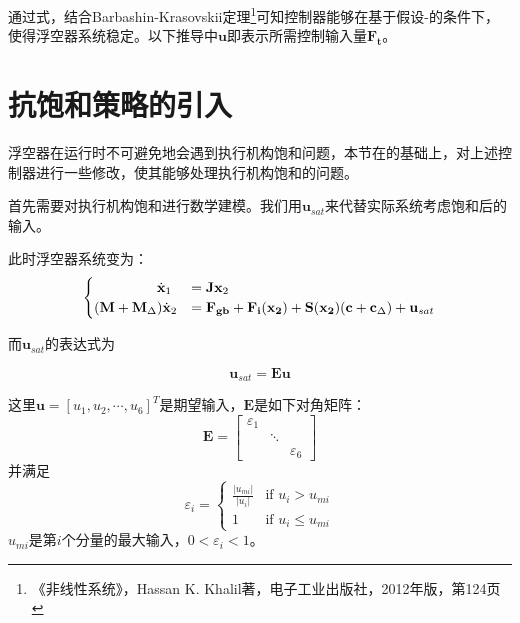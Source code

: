 通过式，结合Barbashin-Krasovskii定理\footnote{《非线性系统》\cite{Khalilnonlinearbookchinese}，Hassan K. Khalil著，电子工业出版社，2012年版，第124页}可知控制器能够在基于假设-的条件下，使得浮空器系统稳定。以下推导中$\mathbf{u}$即表示所需控制输入量$\mathbf{F_t}$。

\section{抗饱和策略的引入}\label{sec:3sat}
浮空器在运行时不可避免地会遇到执行机构饱和问题，本节在的基础上，对上述控制器进行一些修改，使其能够处理执行机构饱和的问题。

首先需要对执行机构饱和进行数学建模。我们用$\mathbf{u}_{sat}$来代替实际系统考虑饱和后的输入。

此时浮空器系统变为：
\begin{equation}\label{eq:modelwcsat}
    \begin{cases}
    \hspace{4.5em}\dot{\mathbf{x}}_1 &= \mathbf{J}\mathbf{x}_2\\
    (\mathbf{M}+\mathbf{M}_{\Delta})\dot{\mathbf{x}}_2&=\mathbf{F_{gb}+F_{i}(x_2)}+\mathbf{S(x_2)} (\mathbf{c}+\mathbf{c}_{\Delta})+\mathbf{u}_{sat}
    \end{cases}
\end{equation}

而$\mathbf{u}_{sat}$的表达式为

\begin{equation}\label{eq:satu}
    \mathbf{u}_{sat} = \mathbf{E}\mathbf{u}
\end{equation}

这里$\mathbf{u}=[u_1,u_2,\cdots,u_6]^T$是期望输入，$\mathbf{E}$是如下对角矩阵：
\begin{equation*}
    \mathbf{E} = \left[\begin{matrix}
         \varepsilon_1&&  \\
         &\ddots& \\
         &&\varepsilon_6
    \end{matrix}\right] 
\end{equation*}
并满足
\begin{equation*}
    \varepsilon_i = \begin{cases}
    \frac{|u_{mi}|}{|u_i|} & \text{if } u_i>u_{mi}\\
    1 & \text{if } u_i \leqslant u_{mi}
    \end{cases}
\end{equation*}
$u_{mi}$是第$i$个分量的最大输入，$0<\varepsilon_i<1$。

